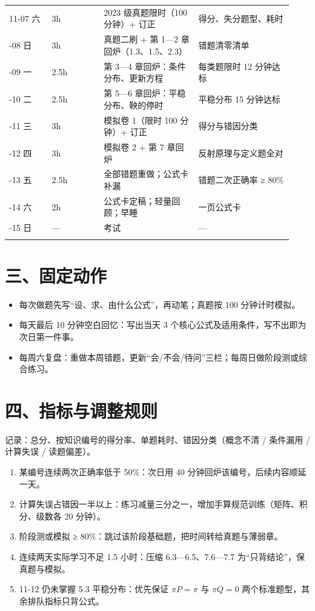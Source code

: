 \documentclass[UTF8,a4paper,11pt]{ctexart}
\begin{document}
{\begin{longtable}{P{0.14\linewidth}P{0.17\linewidth}P{0.31\linewidth}P{0.31\linewidth}}
11-07 六 & 3h & 2023 级真题限时（100 分钟）+ 订正 & 得分、失分题型、耗时 \\
-08 日 & 3h & 真题二刷 + 第 1—2 章回炉（1.3、1.5、2.3） & 错题清零清单 \\
-09 一 & 2.5h & 第 3—4 章回炉：条件分布、更新方程 & 每类题限时 12 分钟达标 \\
-10 二 & 2.5h & 第 5—6 章回炉：平稳分布、鞅的停时 & 平稳分布 15 分钟达标 \\
-11 三 & 3h & 模拟卷 1（限时 100 分钟）+ 订正 & 得分与错因分类 \\
-12 四 & 3h & 模拟卷 2 + 第 7 章回炉 & 反射原理与定义题全对 \\
-13 五 & 2.5h & 全部错题重做；公式卡补漏 & 错题二次正确率 ≥ 80\% \\
-14 六 & 2h & 公式卡定稿；轻量回顾；早睡 & 一页公式卡 \\
-15 日 & — & 考试 & — \\
\addlinespace[.35em]
\bottomrule
\end{longtable}
}
\section{三、固定动作}
\begin{itemize}
\item 每次做题先写“设、求、由什么公式”，再动笔；真题按 100 分钟计时模拟。
\item 每天最后 10 分钟空白回忆：写出当天 3 个核心公式及适用条件，写不出即为次日第一件事。
\item 每周六复盘：重做本周错题，更新“会/不会/待问”三栏；每周日做阶段测或综合练习。
\end{itemize}
\section{四、指标与调整规则}
记录：总分、按知识编号的得分率、单题耗时、错因分类（概念不清 / 条件漏用 / 计算失误 / 读题偏差）。

\begin{enumerate}
\item 某编号连续两次正确率低于 50\%：次日用 40 分钟回炉该编号，后续内容顺延一天。
\item 计算失误占错因一半以上：练习减量三分之一，增加手算规范训练（矩阵、积分、级数各 20 分钟）。
\item 阶段测或模拟 ≥ 80\%：跳过该阶段基础题，把时间转给真题与薄弱章。
\item 连续两天实际学习不足 1.5 小时：压缩 6.3—6.5、7.6—7.7 为“只背结论”，保真题与模拟。
\item 11-12 仍未掌握 5.3 平稳分布：优先保证 $\pi P=\pi$ 与 $\pi Q=0$ 两个标准题型，其余排队指标只背公式。
\end{enumerate}
\end{document}
